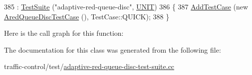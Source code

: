 \begin{DoxyCode}
385     : \hyperlink{classns3_1_1TestSuite_a904b0c40583b744d30908aeb94636d1a}{TestSuite} (\textcolor{stringliteral}{"adaptive-red-queue-disc"}, \hyperlink{classns3_1_1TestSuite_a1ebfcab34ec8161e085e8e3a1855eae0a3885375a3787abf60431f8454b3cadbd}{UNIT})
386   \{
387     \hyperlink{classns3_1_1TestCase_a3718088e3eefd5d6454569d2e0ddd835}{AddTestCase} (\textcolor{keyword}{new} \hyperlink{classAredQueueDiscTestCase}{AredQueueDiscTestCase} (), TestCase::QUICK);
388   \}
\end{DoxyCode}


Here is the call graph for this function\+:




The documentation for this class was generated from the following file\+:\begin{DoxyCompactItemize}
\item 
traffic-\/control/test/\hyperlink{adaptive-red-queue-disc-test-suite_8cc}{adaptive-\/red-\/queue-\/disc-\/test-\/suite.\+cc}\end{DoxyCompactItemize}
